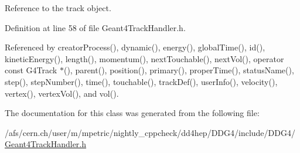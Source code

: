 Reference to the track object. 

Definition at line 58 of file Geant4TrackHandler.h.

Referenced by creatorProcess(), dynamic(), energy(), globalTime(), id(), kineticEnergy(), length(), momentum(), nextTouchable(), nextVol(), operator const G4Track $\ast$(), parent(), position(), primary(), properTime(), statusName(), step(), stepNumber(), time(), touchable(), trackDef(), userInfo(), velocity(), vertex(), vertexVol(), and vol().

The documentation for this class was generated from the following file:\begin{DoxyCompactItemize}
\item 
/afs/cern.ch/user/m/mpetric/nightly\_\-cppcheck/dd4hep/DDG4/include/DDG4/\hyperlink{_geant4_track_handler_8h}{Geant4TrackHandler.h}\end{DoxyCompactItemize}
